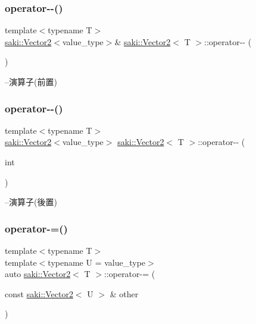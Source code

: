 \subsubsection{\texorpdfstring{operator-\/-\/()}{operator--()}\hspace{0.1cm}{\footnotesize\ttfamily [1/2]}}
{\footnotesize\ttfamily template$<$typename T$>$ \\
\mbox{\hyperlink{classsaki_1_1_vector2}{saki\+::\+Vector2}}$<$value\+\_\+type$>$\& \mbox{\hyperlink{classsaki_1_1_vector2}{saki\+::\+Vector2}}$<$ T $>$\+::operator-\/-\/ (\begin{DoxyParamCaption}{ }\end{DoxyParamCaption})\hspace{0.3cm}{\ttfamily [inline]}}



--演算子(前置) 

\mbox{\label{classsaki_1_1_vector2_ac53f3abd663c5f4c7d4f76a1ad778fbd}} 
\subsubsection{\texorpdfstring{operator-\/-\/()}{operator--()}\hspace{0.1cm}{\footnotesize\ttfamily [2/2]}}
{\footnotesize\ttfamily template$<$typename T$>$ \\
\mbox{\hyperlink{classsaki_1_1_vector2}{saki\+::\+Vector2}}$<$value\+\_\+type$>$ \mbox{\hyperlink{classsaki_1_1_vector2}{saki\+::\+Vector2}}$<$ T $>$\+::operator-\/-\/ (\begin{DoxyParamCaption}\item[{int}]{ }\end{DoxyParamCaption})\hspace{0.3cm}{\ttfamily [inline]}}



--演算子(後置) 

\mbox{\label{classsaki_1_1_vector2_afd6a046c01ddbe65b965b1e0ad7ef2ef}} 
\subsubsection{\texorpdfstring{operator-\/=()}{operator-=()}}
{\footnotesize\ttfamily template$<$typename T$>$ \\
template$<$typename U  = value\+\_\+type$>$ \\
auto \mbox{\hyperlink{classsaki_1_1_vector2}{saki\+::\+Vector2}}$<$ T $>$\+::operator-\/= (\begin{DoxyParamCaption}\item[{const \mbox{\hyperlink{classsaki_1_1_vector2}{saki\+::\+Vector2}}$<$ U $>$ \&}]{other }\end{DoxyParamCaption})\hspace{0.3cm}{\ttfamily [inline]}}



